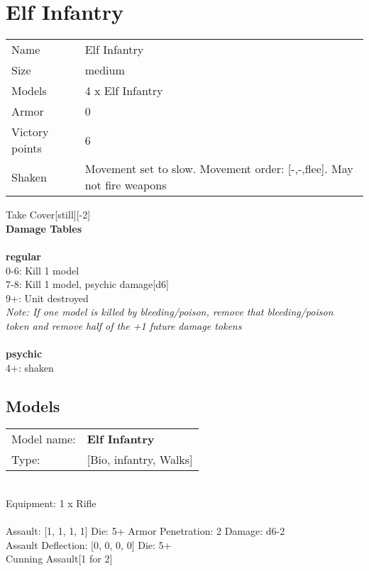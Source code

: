\clearpage

\section{ Elf Infantry }

\begin{tabular}{ll}
  Name & Elf Infantry \\
  Size & medium\\
  Models & 4 x Elf Infantry\\
  Armor & 0\\
  Victory points & 6\\
  Shaken & Movement set to slow. Movement order: [-,-,flee]. May not fire weapons\\
\end{tabular}

Take Cover[still][-2]\\ 



{\bf Damage Tables} \\
\ \\ {\bf regular } \\
0-6: Kill 1 model \\
7-8: Kill 1 model, psychic damage[d6] \\
9+: Unit destroyed \\
{{\it Note: If one model is killed by bleeding/poison, remove that bleeding/poison \\ token and remove half of the +1 future damage tokens}} \\
\ \\ {\bf psychic } \\
4+: shaken \\


\pagebreak

\subsection{ Models }

\begin{tabular}{ll}
Model name: & {\bf Elf Infantry } \\
Type: & [Bio, infantry, Walks] \\
\end{tabular}
\ \\
Equipment: 1 x Rifle \\
\ \\
Assault: [1, 1, 1, 1] Die: 5+ Armor Penetration: 2 Damage: d6-2 \\
Assault Deflection: [0, 0, 0, 0] Die: 5+\\
\indent Cunning Assault[1 for 2]\\ 
 
